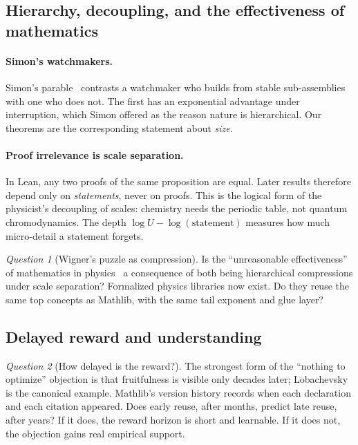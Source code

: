 \documentclass[11pt]{article}
\theoremstyle{remark}
\newtheorem{question}{Question}
\begin{document}
\subsection{Hierarchy, decoupling, and the effectiveness of mathematics}

\paragraph{Simon's watchmakers.} Simon's parable~\cite{simon} contrasts a watchmaker who
builds from stable sub-assemblies with one who does not. The first has an exponential
advantage under interruption, which Simon offered as the reason nature is hierarchical.
Our theorems are the corresponding statement about \emph{size}.

\paragraph{Proof irrelevance is scale separation.} In Lean, any two proofs of the same
proposition are equal. Later results therefore depend only on \emph{statements}, never on
proofs. This is the logical form of the physicist's decoupling of scales: chemistry needs
the periodic table, not quantum chromodynamics. The depth $\log U-\log(\text{statement})$
measures how much micro-detail a statement forgets.

\begin{question}[Wigner's puzzle as compression]
Is the ``unreasonable effectiveness'' of mathematics in physics~\cite{wigner} a consequence
of both being hierarchical compressions under scale separation? Formalized physics
libraries now exist. Do they reuse the same top concepts as Mathlib, with the same tail
exponent and glue layer?
\end{question}

\subsection{Delayed reward and understanding}

\begin{question}[How delayed is the reward?]
The strongest form of the ``nothing to optimize'' objection is that fruitfulness is
visible only decades later; Lobachevsky is the canonical example. Mathlib's version history
records when each declaration and each citation appeared. Does early reuse, after months,
predict late reuse, after years? If it does, the reward horizon is short and learnable. If
it does not, the objection gains real empirical support.
\end{question}
\end{document}
